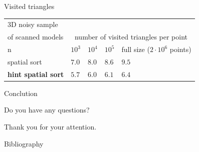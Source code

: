 \documentclass{beamer}
\begin{document}
\begin{frame}{Visited triangles}
\begin{tabular}{|l||l|l|l|l|}
\hline
3D noisy sample \\
of scanned models& \multicolumn{4}{|c|}{number of visited triangles per point}\\
 \hline \hline
    n & $10^3$ & $10^4$ & $10^5$ & full size ($2 \cdot 10^6$ points)\\\hline
    spatial sort & $7.0$ & $8.0$ & $8.6$ & $9.5$\\\hline
    \textbf{hint spatial sort} & $5.7$ & $6.0$ & $6.1$ & $6.4$\\\hline
\end{tabular}
\end{frame}

\begin{frame}{Conclution}

\end{frame}

\begin{frame}
\centering
\huge{Do you have any questions?}\\
\pause
\vspace*{1.5cm}
\centerline{\large{Thank you for your attention.}}
\end{frame}

\begin{frame}{Bibliography}
  
\nocite{*}

\end{frame}
\end{document}
